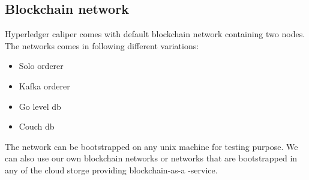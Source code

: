 \documentclass{ceadar_article}
\begin{document}
\subsection{Blockchain network}
Hyperledger caliper comes with default blockchain network containing two nodes. The networks comes in following different variations:

\begin{itemize}
    \item Solo orderer
    \item Kafka orderer
    \item Go level db
    \item Couch db
\end{itemize}

The network can be bootstrapped on any unix machine for testing purpose. \newline
We can also use our own blockchain networks or networks that are bootstrapped in any of the cloud storge providing blockchain-as-a 
-service.
\newpage



\end{document}
